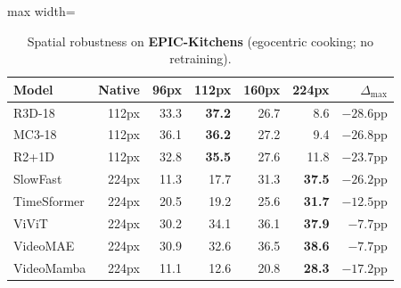 \documentclass[a4paper, 10pt, conference, onecolumn]{ieeeconf}
\newcommand{\tabtight}{\setlength{\tabcolsep}{3.5pt}\renewcommand{\arraystretch}{1.12}}
\begin{document}
\begin{table}[!htbp]
\centering
\caption{Spatial robustness on \textbf{EPIC-Kitchens} (egocentric cooking; no retraining).}
\label{tab:sup_sp_epic}
\scriptsize\tabtight
\begin{adjustbox}{max width=\textwidth}
\begin{tabular}{l r rrrr r}
\toprule
Model & Native & 96px & 112px & 160px & 224px & $\Delta_\text{max}$ \\
\midrule
R3D-18      & 112px & 33.3 & \textbf{37.2} & 26.7 &  8.6 & $-28.6$pp \\
MC3-18      & 112px & 36.1 & \textbf{36.2} & 27.2 &  9.4 & $-26.8$pp \\
R2+1D       & 112px & 32.8 & \textbf{35.5} & 27.6 & 11.8 & $-23.7$pp \\
SlowFast    & 224px & 11.3 & 17.7 & 31.3 & \textbf{37.5} & $-26.2$pp \\
\midrule
TimeSformer & 224px & 20.5 & 19.2 & 25.6 & \textbf{31.7} & $-12.5$pp \\
ViViT       & 224px & 30.2 & 34.1 & 36.1 & \textbf{37.9} & $-7.7$pp \\
VideoMAE    & 224px & 30.9 & 32.6 & 36.5 & \textbf{38.6} & $-7.7$pp \\
VideoMamba  & 224px & 11.1 & 12.6 & 20.8 & \textbf{28.3} & $-17.2$pp \\
\bottomrule
\end{tabular}
\end{adjustbox}
\end{table}
\end{document}
